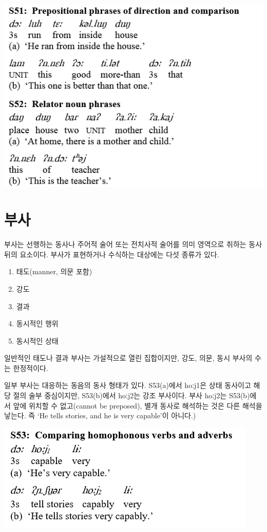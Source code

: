 \includegraphics{Pacoh/src/PacohS51.png}


\section{부사}
부사는 선행하는 동사나 주어적 술어 또는 전치사적 술어를 의미 영역으로 취하는 동사 뒤의 요소이다.
부사가 표현하거나 수식하는 대상에는 다섯 종류가 있다.
\begin{enumerate}
\item 태도(manner, 의문 포함)
\item 강도
\item 결과
\item 동시적인 행위
\item 동시적인 상태
\end{enumerate}

일반적인 태도나 결과 부사는 가설적으로 열린 집합이지만, 강도, 의문, 동시 부사의 수는 한정적이다.

일부 부사는 대응하는 동음의 동사 형태가 있다. S53(a)에서 hoːj1은 상태 동사이고 해당 절의 술부 중심이지만, S53(b)에서 hoːj2는 강조 부사이다. 부사 hoːj2는 S53(b)에서 앞에 위치할 수 없고(cannot be preposed), 별개 동사로 해석하는 것은 다른 해석을 낳는다. 즉 `He tells stories, and he is very capable'이 아니다.)

\includegraphics{Pacoh/src/PacohS53.png}

